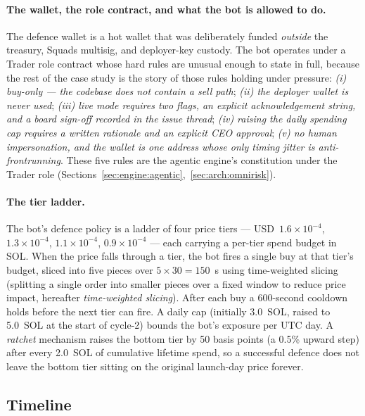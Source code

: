 \documentclass[11pt,a4paper]{article}
\begin{document}
\paragraph{The wallet, the role contract, and what the bot is allowed to do.}
The defence wallet is a hot wallet that was deliberately funded \emph{outside}
the treasury, Squads multisig, and deployer-key custody. The bot operates under
a Trader role contract whose hard rules are unusual enough to state in full,
because the rest of the case study is the story of those rules holding under
pressure: \emph{(i) buy-only --- the codebase does not contain a sell path};
\emph{(ii) the deployer wallet is never used}; \emph{(iii) live mode requires
two flags, an explicit acknowledgement string, and a board sign-off recorded in
the issue thread}; \emph{(iv) raising the daily spending cap requires a written
rationale and an explicit CEO approval}; \emph{(v) no human impersonation, and
the wallet is one address whose only timing jitter is anti-frontrunning}. These
five rules are the agentic engine's constitution under the Trader role
(Sections~\ref{sec:engine:agentic},~\ref{sec:arch:omnirisk}).

\paragraph{The tier ladder.} The bot's defence policy is a ladder of four price
tiers --- USD~$1.6\!\times\!10^{-4}$, $1.3\!\times\!10^{-4}$, $1.1\!\times\!10^{-4}$,
$0.9\!\times\!10^{-4}$ --- each carrying a per-tier spend budget in SOL. When the
price falls through a tier, the bot fires a single buy at that tier's budget,
sliced into five pieces over $5\times 30 = 150$~s using time-weighted slicing
(splitting a single order into smaller pieces over a fixed window to reduce
price impact, hereafter \emph{time-weighted slicing}). After each buy a
600-second cooldown holds before the next tier can fire. A daily cap (initially
3.0~SOL, raised to 5.0~SOL at the start of cycle-2) bounds the bot's exposure
per UTC day. A \emph{ratchet} mechanism raises the bottom tier by 50 basis
points (a 0.5\% upward step) after every 2.0~SOL of cumulative lifetime spend,
so a successful defence does not leave the bottom tier sitting on the original
launch-day price forever.

\subsection{Timeline}\label{sec:case-study:timeline}
\end{document}
